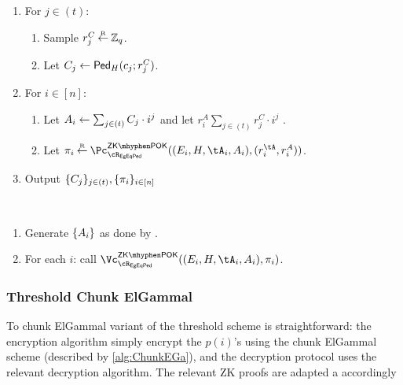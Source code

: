 {\begin{description}
\begin{description}
\begin{enumerate}
	
	\item For $j\in (t)$: 
	
	\begin{enumerate}
		\item Sample  $r^C_j\mathbin{\stackrel{\mbox{\tiny R}}{\leftarrow}} {\mathbb Z}_q$.
		
		\item Let $C_j \leftarrow \mathsf{Ped}_{H}(c_j;r^C_j)$.
		
	\end{enumerate}
	
	\item  For $i \in [n]$: 
	
	
	\begin{enumerate}
		\item  Let $A_i \leftarrow  \sum_{j\in (t)} C_j  \cdot i^j$ and let $r_i^A  \sum_{j\in (t)} r^C_j  \cdot i^j$ . 
		
	
		\item Let $\pi_i \getsr \pZKPOK{\rEgEqPed}((E_i,H,\tA_i,A_i),(r_i^{\tA},r_i^A))$.
	\end{enumerate}
	
	\item Output $\{C_j\}_{j\in (t)},\{\pi_i\}_{i\in [n]}$
\end{enumerate}


\item[\Vc:]   ~

\begin{enumerate}
	
	\item Generate   $\set{A_i}$ as done by \Pc.
	
	\item For each $i$: call $\vZKPOK{\rEgEqPed}((E_i,H,\tA_i,A_i),\pi_i)$.
\end{enumerate}
\end{description}
\end{description}

\subsubsection{Threshold   Chunk ElGammal}
To chunk ElGammal  variant of the threshold scheme is straightforward: the encryption algorithm simply encrypt the $p(i)$'s using the  chunk ElGammal scheme (described by \cref{alg:ChunkEGa}), and the decryption protocol uses the relevant decryption algorithm.  The relevant ZK proofs are adapted a accordingly

\begin{enumerate}
	

\end{enumerate}}
